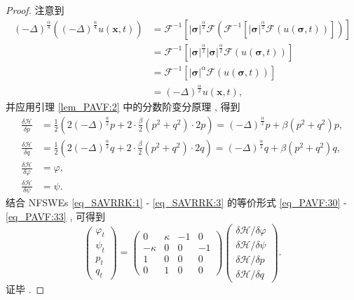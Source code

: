 \begin{proof}
注意到
\begin{align}\label{eq_PAVF:12071}
(-\Delta)^{\frac{\alpha}{4}}((-\Delta)^{\frac{\alpha}{4}}  u(\boldsymbol{x} , t))&=\mathcal{F}^{-1}\left[|\boldsymbol{\sigma}|^{\frac{\alpha}{2}} \mathcal{F}(\mathcal{F}^{-1}\left[|\boldsymbol{\sigma}|^{\frac{\alpha}{2}} \mathcal{F}(u(\boldsymbol{\sigma} , t))\right])\right]\nonumber\\
&=\mathcal{F}^{-1}\left[|\boldsymbol{\sigma}|^{\frac{\alpha}{2}} |\boldsymbol{\sigma}|^{\frac{\alpha}{2}} \mathcal{F}(u(\boldsymbol{\sigma} , t))\right]\nonumber\\
&=\mathcal{F}^{-1}\left[|\boldsymbol{\sigma}|^{\alpha} \mathcal{F}(u(\boldsymbol{\sigma} , t))\right]\nonumber\\
&=(-\Delta)^{\frac{\alpha}{2}} u(\boldsymbol{x} , t) , 
\end{align}
并应用引理 \ref{lem_PAVF:2} 中的分数阶变分原理 , 得到
\begin{align}
\frac{\delta \mathcal{H}}{\delta p} &=\frac{1}{2}\left(2(-\Delta)^{\frac{\alpha}{2}} p+2 \cdot \frac{\beta}{2}\left(p^{2}+q^{2}\right) \cdot 2 p\right)=(-\Delta)^{\frac{\alpha}{2}}p+\beta\left(p^{2}+q^{2}\right) p , \label{eq_PAVF:38a}\\
\frac{\delta \mathcal{H}}{\delta q} &=\frac{1}{2}\left(2(-\Delta)^{\frac{\alpha}{2}} q+2 \cdot \frac{\beta}{2}\left(p^{2}+q^{2}\right) \cdot 2 q\right)=(-\Delta)^{\frac{\alpha}{2}}q+\beta\left(p^{2}+q^{2}\right) q , \label{eq_PAVF:38b}\\
\frac{\delta \mathcal{H}}{\delta \varphi} &=\varphi , \label{eq_PAVF:38c}\\
\frac{\delta \mathcal{H}}{\delta \psi} &=\psi . \label{eq_PAVF:38}
\end{align}
结合 NFSWEs \eqref{eq_SAVRRK:1} - \eqref{eq_SAVRRK:3} 的等价形式 \eqref{eq_PAVF:30} - \eqref{eq_PAVF:33} , 可得到
\begin{equation}\label{eq_PAVF:39}
\left(\begin{array}{l}
		\varphi_{t} \\
		\psi_{t} \\
		p_{t} \\
		q_{t}
\end{array}\right)
=\left(\begin{array}{cccc}
			0 & \kappa & -1 & 0 \\
			-\kappa & 0 & 0 & -1 \\
			1 & 0 & 0 & 0 \\
			0 & 1 & 0 & 0
\end{array}\right)
\left(\begin{array}{l}
		\delta \mathcal{H} / \delta \varphi \\
		\delta \mathcal{H} / \delta \psi \\
		\delta \mathcal{H} / \delta p \\
		\delta \mathcal{H} / \delta q
\end{array}\right) . 
\end{equation}
证毕 . 
\end{proof}

